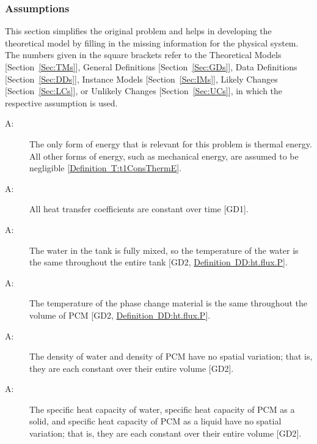 \documentclass[12pt]{article}
\newcounter{assumpnum}
\newcommand{\atheassumpnum}{A\theassumpnum}
\begin{document}
\subsubsection{Assumptions}
\label{Sec:Assumps}
This section simplifies the original problem and helps in developing the theoretical model by filling in the missing information for the physical system. The numbers given in the square brackets refer to the Theoretical Models {[}Section~\ref{Sec:TMs}{]}, General Definitions {[}Section~\ref{Sec:GDs}{]}, Data Definitions {[}Section~\ref{Sec:DDs}{]}, Instance Models {[}Section~\ref{Sec:IMs}{]}, Likely Changes {[}Section~\ref{Sec:LCs}{]}, or Unlikely Changes {[}Section~\ref{Sec:UCs}{]}, in which the respective assumption is used.
\begin{description}
\item[\atheassumpnum\label{A:assump1}:]The only form of energy that is relevant for this problem is thermal energy. All other forms of energy, such as mechanical energy, are assumed to be negligible {[}\hyperref[T:t1ConsThermE]{Definition~T:t1ConsThermE}{]}.
\end{description}
\begin{description}
\item[\atheassumpnum\label{A:assump2}:]All heat transfer coefficients are constant over time {[}GD1{]}.
\end{description}
\begin{description}
\item[\atheassumpnum\label{A:assump3}:]The water in the tank is fully mixed, so the temperature of the water is the same throughout the entire tank {[}GD2, \hyperref[DD:ht.flux.P]{Definition~DD:ht.flux.P}{]}.
\end{description}
\begin{description}
\item[\atheassumpnum\label{A:assump4}:]The temperature of the phase change material is the same throughout the volume of PCM {[}GD2, \hyperref[DD:ht.flux.P]{Definition~DD:ht.flux.P}{]}.
\end{description}
\begin{description}
\item[\atheassumpnum\label{A:assump5}:]The density of water and density of PCM have no spatial variation; that is, they are each constant over their entire volume {[}GD2{]}.
\end{description}
\begin{description}
\item[\atheassumpnum\label{A:assump6}:]The specific heat capacity of water, specific heat capacity of PCM as a solid, and specific heat capacity of PCM as a liquid have no spatial variation; that is, they are each constant over their entire volume {[}GD2{]}.
\end{description}
\end{document}
